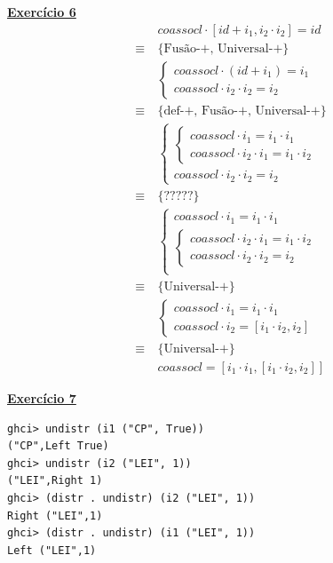 \documentclass[a4paper,11pt]{article}
\begin{document}
	\noindent \underline{\textbf{Exercício 6}}\\
	\[
	\begin{aligned}
		&coassocl \cdot [id + i_1, i_2 \cdot i_2] = id \\
		\equiv \  &\{\text{Fusão-+, Universal-+}\}\\
		&\begin{cases}
			coassocl \cdot (id + i_1) = i_1 \\
			coassocl \cdot i_2 \cdot i_2 = i_2
		\end{cases}\\
		\equiv \  &\{\text{def-+, Fusão-+, Universal-+}\}\\
		&\begin{cases}
			\begin{cases}
				coassocl \cdot i_1 = i_1 \cdot i_1 \\
				coassocl \cdot i_2 \cdot i_1 = i_1 \cdot i_2
			\end{cases} \\
			coassocl \cdot i_2 \cdot i_2 = i_2
		\end{cases}\\
		\equiv \  &\{\text{?????}\}\\
		&\begin{cases}
			coassocl \cdot i_1 = i_1 \cdot i_1 \\
			\begin{cases}
				coassocl \cdot i_2 \cdot i_1 = i_1 \cdot i_2 \\
				coassocl \cdot i_2 \cdot i_2 = i_2
			\end{cases} \\
		\end{cases}\\
		\equiv \  &\{\text{Universal-+}\}\\
		&\begin{cases}
			coassocl \cdot i_1 = i_1 \cdot i_1 \\
			coassocl \cdot i_2 = [i_1 \cdot i_2, i_2]
		\end{cases}\\
		\equiv \  &\{\text{Universal-+}\}\\
		&coassocl = [i_1 \cdot i_1, [i_1 \cdot i_2, i_2]]
	\end{aligned}
	\]
	
	\noindent \underline{\textbf{Exercício 7}}
\begin{verbatim}
ghci> undistr (i1 ("CP", True))
("CP",Left True)
ghci> undistr (i2 ("LEI", 1))
("LEI",Right 1)	
ghci> (distr . undistr) (i2 ("LEI", 1))
Right ("LEI",1)
ghci> (distr . undistr) (i1 ("LEI", 1))
Left ("LEI",1)
\end{verbatim}
	
\end{document}
